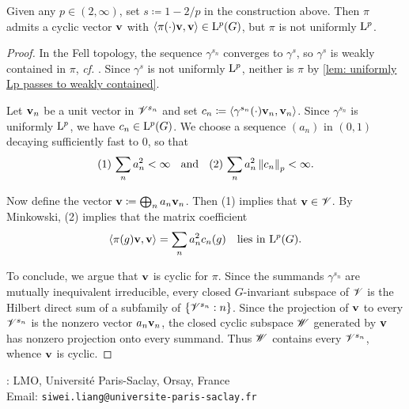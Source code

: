 \documentclass[a4paper, 10pt]{article}
\begin{document}
    \begin{proposition}\label{prop: disprove samei-wiersma conj, SL2R}
        Given any $p\in(2,\infty)$, set $s\coloneq 1-2/p$ in the construction above.
        Then $\pi$ admits a cyclic vector $\mathbf{v}$ with $\left\langle\pi(\cdot)\mathbf{v},\mathbf{v} \right\rangle\in \mathrm{L}^p(G)$, but $\pi$ is not uniformly $\mathrm{L}^p$.
    \end{proposition}
    \begin{proof}
        In the Fell topology, the sequence $\gamma^{s_n}$ converges to $\gamma^s$, so $\gamma^s$ is weakly contained in $\pi$, \emph{cf.} \cite[\S9.6]{einsiedler-ward2025unitary}. Since $\gamma^s$ is not uniformly $\mathrm{L}^p$, neither is $\pi$ by \autoref{lem: uniformly Lp passes to weakly contained}.

        Let $\mathbf{v}_n$ be a unit vector in $\mathscr{V}^{s_n}$ and set $c_n\coloneq \left\langle\gamma^{s_n}(\cdot)\mathbf{v}_n,\mathbf{v}_n \right\rangle$.
        Since $\gamma^{s_n}$ is uniformly $\mathrm{L}^p$, we have $c_n\in\mathrm{L}^p(G)$.
        We choose a sequence $(a_n)$ in $(0,1)$ decaying sufficiently fast to 0, so that 
        \begin{equation*}
            \text{(1) $\sum_n a_n^2 <\infty$ \; and \; (2) $\sum_n a_n^{2} \left\| c_n \right\|_p <\infty$.}
        \end{equation*}

        Now define the vector $\mathbf{v}\coloneq\bigoplus_{n} a_n \mathbf{v}_n$.
        Then (1) implies that $\mathbf{v}\in\mathscr{V}$. By Minkowski, (2) implies that the matrix coefficient 
        \begin{equation*}
            \left\langle\pi(g)\mathbf{v}, \mathbf{v} \right\rangle = \sum_n a_n^2 c_n(g) \quad \text{lies in $\mathrm{L}^p(G)$.}
        \end{equation*}

        To conclude, we argue that $\mathbf{v}$ is cyclic for $\pi$. 
        Since the summands $\gamma^{s_n}$ are mutually inequivalent irreducible, every closed $G$-invariant subspace of $\mathscr{V}$ is the Hilbert direct sum of a subfamily of $\left\{ \mathscr{V}^{s_n}:n \right\}$.
        Since the projection of $\mathbf{v}$ to every $\mathscr{V}^{s_n}$ is the nonzero vector $a_n\mathbf{v}_n$, the closed cyclic subspace $\mathscr{W}$ generated by $\mathbf{v}$ has nonzero projection onto every summand. Thus $\mathscr{W}$ contains every $\mathscr{V}^{s_n}$, whence $\mathbf{v}$ is cyclic.
    \end{proof}


    
    {\small }

    \vspace*{1em}
    : LMO, Université Paris-Saclay, Orsay, France\\
    Email: \texttt{siwei.liang@universite-paris-saclay.fr}
\end{document}
